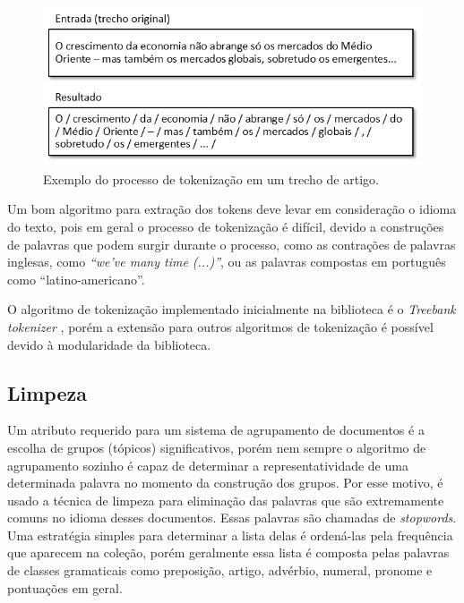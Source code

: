 \documentclass[a4paper,12pt]{article}
\begin{document}
\begin{figure}[H]
    \begin{center}
        \includegraphics[scale=0.6]{tokenizacao.png}
    \end{center}
    \caption{Exemplo do processo de tokenização em um  trecho de artigo.}
    \label{fig:tokenizacao}
\end{figure}

Um bom algoritmo para extração dos tokens deve levar em consideração o idioma do texto, pois em geral o processo de tokenização é difícil, devido a construções de palavras que podem surgir durante o processo, como as contrações de palavras inglesas, como \textit{“we’ve many time (...)”}, ou as palavras compostas em português como “latino-americano”. 

O algoritmo de tokenização implementado inicialmente na biblioteca é o \textit{Treebank tokenizer} \cite{treebank}, porém a extensão para outros algoritmos de tokenização é possível devido à modularidade da biblioteca.

\subsection {Limpeza}
\label {sec:limpeza}

Um atributo requerido para um sistema de agrupamento de documentos é a escolha de grupos (tópicos) significativos, porém nem sempre o algoritmo de agrupamento sozinho é capaz de determinar a representatividade de uma determinada palavra no momento da construção dos grupos. Por esse motivo, é usado a técnica de limpeza para eliminação das palavras que são extremamente comuns no idioma desses documentos. Essas palavras são chamadas de \textit{stopwords}. Uma estratégia simples para determinar a lista delas é ordená-las pela frequência que aparecem na coleção, porém geralmente essa lista é composta pelas palavras de classes gramaticais como preposição, artigo, advérbio, numeral, pronome e pontuações em geral.
\end{document}
